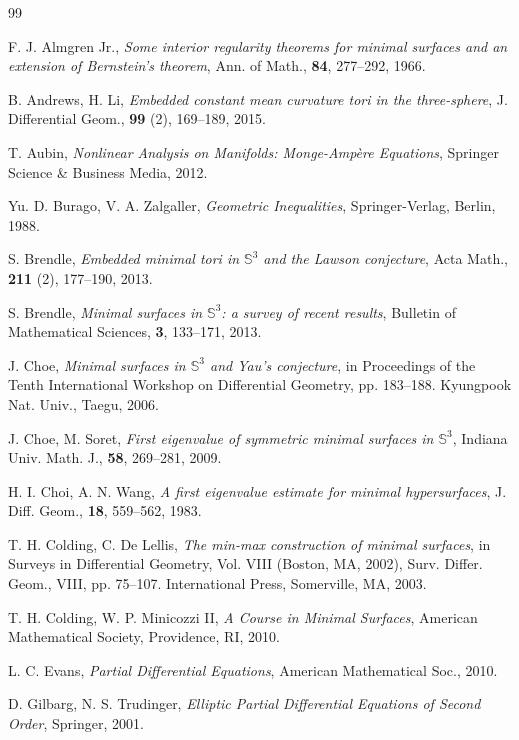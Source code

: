 \documentclass[a4, 12pt]{amsart}
\numberwithin{equation}{section} \numberwithin{equation}{section}
\begin{document}
\begin{thebibliography}{99}

F. J. Almgren Jr., \textit{Some interior regularity theorems for minimal surfaces and an extension of Bernstein's theorem}, Ann. of Math., {\bf 84}, 277--292, 1966.

B. Andrews, H. Li, \textit{Embedded constant mean curvature tori in the three-sphere}, J. Differential Geom., {\bf 99} (2), 169--189, 2015.

T. Aubin, \textit{Nonlinear Analysis on Manifolds: Monge-Amp\`{e}re Equations}, Springer Science \& Business Media, 2012.

Yu. D. Burago, V. A. Zalgaller, \textit{Geometric Inequalities}, Springer-Verlag, Berlin, 1988.

S. Brendle, \textit{Embedded minimal tori in $\mathbb{S}^3$ and the Lawson conjecture}, Acta Math., {\bf 211} (2), 177--190, 2013.

S. Brendle, \textit{Minimal surfaces in $\mathbb{S}^3$: a survey of recent results}, Bulletin of Mathematical Sciences, {\bf 3}, 133--171, 2013.

J. Choe, \textit{Minimal surfaces in $\mathbb{S}^3$ and Yau's conjecture}, in Proceedings of the Tenth International Workshop on Differential Geometry, pp. 183--188. Kyungpook Nat. Univ., Taegu, 2006.

J. Choe, M. Soret, \textit{First eigenvalue of symmetric minimal surfaces in $\mathbb{S}^3$}, Indiana Univ. Math. J., {\bf 58}, 269--281, 2009.

H. I. Choi, A. N. Wang, \textit{A first eigenvalue estimate for minimal hypersurfaces}, J. Diff. Geom., {\bf 18}, 559--562, 1983.

T. H. Colding, C. De Lellis, \textit{The min-max construction of minimal surfaces}, in Surveys in Differential Geometry, Vol. VIII (Boston, MA, 2002), Surv. Differ. Geom., VIII, pp. 75--107. International Press, Somerville, MA, 2003.

T. H. Colding, W. P. Minicozzi II, \textit{A Course in Minimal Surfaces}, American Mathematical Society, Providence, RI, 2010.

L. C. Evans, \textit{Partial Differential Equations}, American Mathematical Soc., 2010.

D. Gilbarg, N. S. Trudinger, \textit{Elliptic Partial Differential Equations of Second Order}, Springer, 2001.


\end{thebibliography}
\end{document}
